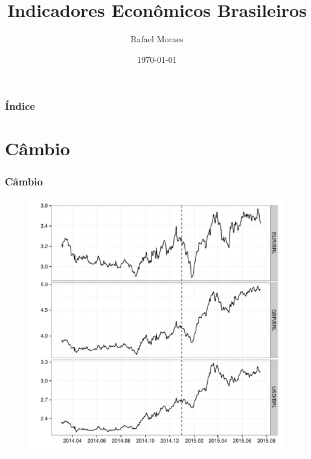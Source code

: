 \documentclass{beamer}
\begin{document}
\title{Indicadores Econômicos Brasileiros}
\author{Rafael Moraes}
\date{\today}

\begin{frame}
\titlepage
\end{frame}

\begin{frame}
\frametitle{Índice}\tableofcontents
\end{frame}

\section{Câmbio}
\begin{frame}
  \frametitle{Câmbio}
  \begin{figure}[ht]
      \centering
      \includegraphics[height=0.80\textheight]{cambio.pdf}
  \end{figure}
\end{frame}
\end{document}
